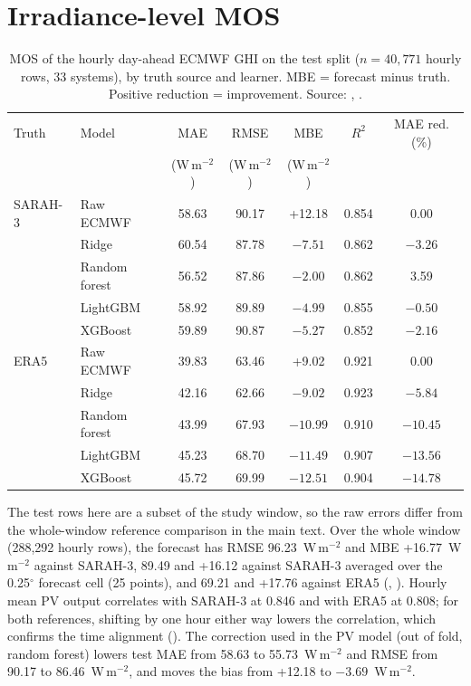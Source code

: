 \section{Irradiance-level MOS}
\label{sec:s-mos}

\begin{table}[H]
\centering
\caption{MOS of the hourly day-ahead ECMWF GHI on the test split ($n = 40{,}771$ hourly rows, 33 systems), by truth source and learner. MBE = forecast minus truth. Positive reduction = improvement. Source: , .}
\label{tab:s-mos}
\small
\begin{tabular}{@{}l l c c c c c@{}}
\toprule
Truth & Model & MAE & RMSE & MBE & $R^2$ & MAE red. (\%) \\
 & & (W\,m$^{-2}$) & (W\,m$^{-2}$) & (W\,m$^{-2}$) & & \\
\midrule
SARAH-3 & Raw ECMWF & 58.63 & 90.17 & +12.18 & 0.854 & 0.00 \\
 & Ridge & 60.54 & 87.78 & $-7.51$ & 0.862 & $-3.26$ \\
 & Random forest & 56.52 & 87.86 & $-2.00$ & 0.862 & 3.59 \\
 & LightGBM & 58.92 & 89.89 & $-4.99$ & 0.855 & $-0.50$ \\
 & XGBoost & 59.89 & 90.87 & $-5.27$ & 0.852 & $-2.16$ \\
\midrule
ERA5 & Raw ECMWF & 39.83 & 63.46 & +9.02 & 0.921 & 0.00 \\
 & Ridge & 42.16 & 62.66 & $-9.02$ & 0.923 & $-5.84$ \\
 & Random forest & 43.99 & 67.93 & $-10.99$ & 0.910 & $-10.45$ \\
 & LightGBM & 45.23 & 68.70 & $-11.49$ & 0.907 & $-13.56$ \\
 & XGBoost & 45.72 & 69.99 & $-12.51$ & 0.904 & $-14.78$ \\
\bottomrule
\end{tabular}
\end{table}

The test rows here are a subset of the study window, so the raw errors differ from the whole-window reference comparison in the main text. Over the whole window (288,292 hourly rows), the forecast has RMSE 96.23~W\,m$^{-2}$ and MBE +16.77~W\,m$^{-2}$ against SARAH-3, 89.49 and +16.12 against SARAH-3 averaged over the 0.25$^\circ$ forecast cell (25 points), and 69.21 and +17.76 against ERA5 (, ). Hourly mean PV output correlates with SARAH-3 at 0.846 and with ERA5 at 0.808; for both references, shifting by one hour either way lowers the correlation, which confirms the time alignment (). The correction used in the PV model (out of fold, random forest) lowers test MAE from 58.63 to 55.73~W\,m$^{-2}$ and RMSE from 90.17 to 86.46~W\,m$^{-2}$, and moves the bias from +12.18 to $-3.69$~W\,m$^{-2}$.

